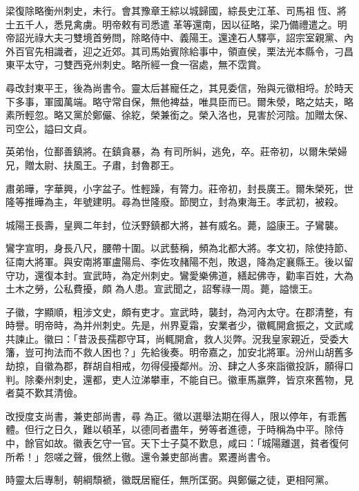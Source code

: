 \begin{pinyinscope}
 梁復除略衡州刺史，未行。會其豫章王綜以城歸國，綜長史江革、司馬祖恆、將士五千人，悉見禽虜。明帝敕有司悉遣
 革等還南，因以征略，梁乃備禮遣之。明帝詔光祿大夫刁雙境首勞問，除略侍中、義陽王。還達石人驛亭，詔宗室親黨、內外百官先相識者，迎之近郊。其司馬始賓除給事中，領直侯，栗法光本縣令，刁昌東平太守，刁雙西兗州刺史。略所經一食一宿處，無不霑賞。



 尋改封東平王，後為尚書令。靈太后甚寵任之，其見委信，殆與元徽相埒。於時天下多事，軍國萬端。略守常自保，無他裨益，唯具臣而已。爾朱滎，略之姑夫，略素所輕忽。略又黨於鄭儼、徐紇，榮兼銜之。榮入洛也，見害於河陰。加贈太保、司空公，謚曰文貞。



 英弟怡，位鄯善鎮將。在鎮貪暴，為
 有司所糾，逃免，卒。莊帝初，以爾朱榮婦兄，贈太尉、扶風王。子肅，封魯郡王。



 肅弟曄，字華興，小字盆子。性輕躁，有膂力。莊帝初，封長廣王。爾朱榮死，世隆等推曄為主，年號建明。尋為世隆廢。節閔立，封為東海王。孝武初，被殺。



 城陽王長壽，皇興二年封，位沃野鎮都大將，甚有威名。薨，謚康王。子鸞襲。



 鸞字宣明，身長八尺，腰帶十圍。以武藝稱，頻為北都大將。孝文初，除使持節、征南大將軍。與安南將軍盧陽烏、李佐攻赭陽不剋，敗退，降為定襄縣王。後以留守功，還復本封。宣武時，為定州刺史。鸞愛樂佛道，繕起佛寺，勸率百姓，大為土木之勞，公私費擾，頗
 為人患。宣武聞之，詔奪祿一周。薨，謚懷王。



 子徽，字顯順，粗涉文史，頗有吏才。宣武時，襲封，為河內太守。在郡清整，有時譽。明帝時，為并州刺史。先是，州界夏霜，安業者少，徽輒開倉振之，文武咸共諫止。徽曰：「昔汲長孺郡守耳，尚輒開倉，救人災弊。況我皇家親近，受委大籓，豈可拘法而不救人困也？」先給後奏。明帝嘉之，加安北將軍。汾州山胡舊多劫掠，自徽為郡，群胡自相戒，勿得侵擾鄰州。汾、肆之人多來詣徽投訴，願得口判。除秦州刺史，還都，吏人泣涕攀車，不能自已。徽車馬羸弊，皆京來舊物，見者莫不歎其清儉。



 改授度支尚書，兼吏部尚書，尋
 為正。徽以選舉法期在得人，限以停年，有乖舊體。但行之日久，難以頓革，以德同者盡年，勞等者進德，于時稱為中平。除侍中，餘官如故。徽表乞守一官。天下士子莫不歎息，咸曰：「城陽離選，貧者復何所希！」怨嗟之聲，俄然上徹。還令兼吏部尚書。累遷尚書令。



 時靈太后專制，朝綱頹褫，徽既居寵任，無所匡弼。與鄭儼之徒，更相阿黨。




\end{pinyinscope}
